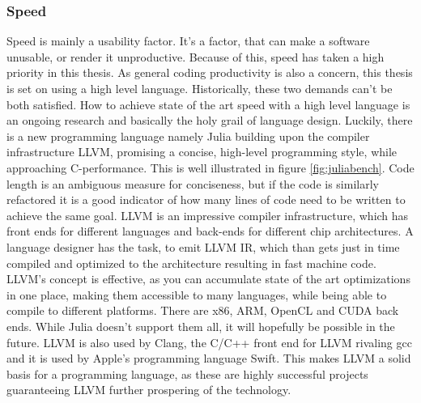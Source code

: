 \subsubsection{Speed}
Speed is mainly a usability factor. It's a factor, that can make a software unusable, or render it unproductive. Because of this, speed has taken a high priority in this thesis. As general coding productivity is also a concern, this thesis is set on using a high level language.
Historically, these two demands can't be both satisfied.
How to achieve state of the art speed with a high level language is an ongoing research and basically the holy grail of language design.
Luckily, there is a new programming language namely Julia building upon the compiler infrastructure \ac{LLVM}, promising a concise, high-level programming style, while approaching C-performance.
This is well illustrated in figure \ref{fig:juliabench}. Code length is an ambiguous measure for conciseness, but if the code is similarly refactored it is a good indicator of how many lines of code need to be written to achieve the same goal.
\ac{LLVM} is an impressive compiler infrastructure, which has front ends for different languages and back-ends for different chip architectures. 
A language designer has the task, to emit \ac{LLVM} \ac{IR}, which than gets just in time compiled and optimized to the architecture resulting in fast machine code.
\ac{LLVM}'s concept is effective, as you can accumulate state of the art optimizations in one place, making them accessible to many languages, while being able to compile to different platforms. There are x86, ARM, OpenCL and CUDA back ends. While Julia doesn't support them all, it will hopefully be possible in the future. 
\ac{LLVM} is also used by Clang, the C/C++ front end for \ac{LLVM} rivaling \ac{gcc} and it is used by Apple's programming language Swift. 
This makes \ac{LLVM} a solid basis for a programming language, as these are highly successful projects guaranteeing \ac{LLVM} further prospering of the technology.

